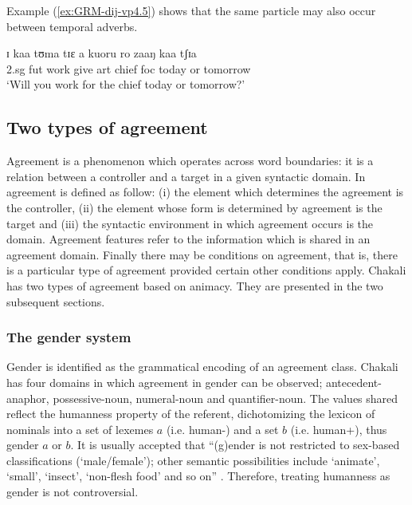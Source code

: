 Example (\ref{ex:GRM-dij-vp4.5}) shows that the same
particle may also occur between
 temporal adverbs. 




\begin{exe}
\ex\label{ex:GRM-dij-vp4.5}

\gll ɪ kaa tʊma tɪɛ a kuoru ro zaaŋ kaa tʃɪa\\
        {\sc 2.sg} {\sc fut} work give {\sc art} chief  {\sc foc} today or
tomorrow\\
\glt  `Will you work for the chief today or tomorrow?' 
\end{exe}



\subsection{Two types of agreement}
\label{sec:GRM-agrrement}

Agreement is a phenomenon which operates
across word boundaries: it is a relation between a controller and a
target in a given syntactic domain. In \cite{Corb04, Corb06} 
  agreement is defined as follow: (i) the element which determines the
  agreement is the controller, (ii) the element whose form is determined by
  agreement is the target and (iii) the syntactic environment in which
  agreement occurs is the domain. Agreement features refer to the information
which is shared in an agreement domain. Finally there may be conditions on
  agreement, that  is, there is a particular type of agreement provided certain
  other conditions apply. Chakali has two types of agreement based on animacy.
They are presented in the two subsequent sections. 

\subsubsection{The gender system}
\label{sec:GRM-gender}


Gender is identified as the grammatical encoding of an agreement class.  
Chakali has four domains
in which agreement in gender can be observed; antecedent-anaphor,
possessive-noun, numeral-noun and  quantifier-noun.
The values shared reflect the humanness property of the referent,
dichotomizing the lexicon of nominals into a set of lexemes $a$ (i.e.
human-) and a set $b$ (i.e.  human+), thus {\sc gender} $a$ or
$b$.  It is usually accepted that ``(g)ender is not restricted to
sex-based classifications (`male/female'); other semantic
possibilities include `animate', `small', `insect', `non-flesh food'
and so on'' \citep[293]{Corb00}. Therefore, treating humanness as gender
is not controversial.

